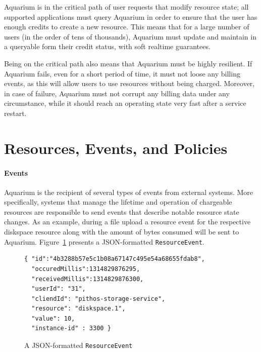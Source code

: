 \documentclass[letterpaper,twocolumn,10pt]{article}
\begin{document}
Aquarium is in the critical path of user requests that modify resource
state; all supported applications must query Aquarium in order to
ensure that the user has enough credits to create a new resource. This
means that for a large number of users (in the order of tens of thousands),
Aquarium must update and maintain in a queryable form their credit
status, with soft realtime guarantees.

Being on the critical path also means that Aquarium must be highly
resilient. If Aquarium fails, even for a short period of time, it must
not loose any billing events, as this will allow users to use
resources without being charged. Moreover, in case of failure,
Aquarium must not corrupt any billing data under any circumstance,
while it should reach an operating state very fast after a service
restart.

\section{Resources, Events, and Policies}

\paragraph{Events}
Aquarium is the recipient of several types of events from external
systems. More specifically, systems that manage the lifetime and
operation of chargeable resources are responsible to send events that
describe notable resource state changes. As an example, during a file upload a resource event for the respective \textsf{diskspace} resource along with the amount of bytes consumed will be sent to Aquarium.
Figure~\ref{fig:resevt} presents a JSON-formatted
\texttt{ResourceEvent}.

\begin{figure}
\lstset{language=C, basicstyle=\footnotesize,
stringstyle=\ttfamily, 
flexiblecolumns=true, aboveskip=-0.9em, belowskip=0em, lineskip=0em}

\begin{lstlisting}
{ "id":"4b3288b57e5c1b08a67147c495e54a68655fdab8",
  "occuredMillis":1314829876295,
  "receivedMillis":1314829876300,
  "userId": "31",
  "cliendId": "pithos-storage-service",
  "resource": "diskspace.1",
  "value": 10,
  "instance-id" : 3300 }
\end{lstlisting}
\caption{A JSON-formatted \texttt{ResourceEvent}} 
\label{fig:resevt}
\end{figure}
\end{document}
